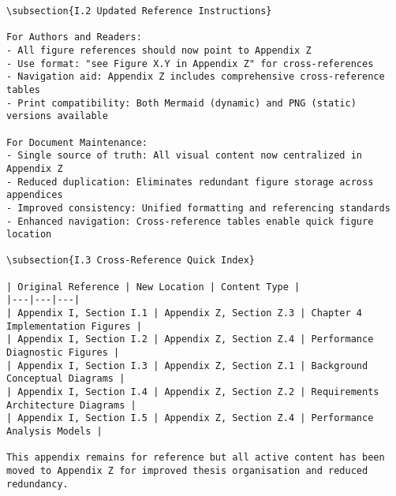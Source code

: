 \begin{verbatim}
\subsection{I.2 Updated Reference Instructions}

For Authors and Readers:
- All figure references should now point to Appendix Z
- Use format: "see Figure X.Y in Appendix Z" for cross-references
- Navigation aid: Appendix Z includes comprehensive cross-reference tables
- Print compatibility: Both Mermaid (dynamic) and PNG (static) versions available

For Document Maintenance:
- Single source of truth: All visual content now centralized in Appendix Z
- Reduced duplication: Eliminates redundant figure storage across appendices
- Improved consistency: Unified formatting and referencing standards
- Enhanced navigation: Cross-reference tables enable quick figure location

\subsection{I.3 Cross-Reference Quick Index}

| Original Reference | New Location | Content Type |
|---|---|---|
| Appendix I, Section I.1 | Appendix Z, Section Z.3 | Chapter 4 Implementation Figures |
| Appendix I, Section I.2 | Appendix Z, Section Z.4 | Performance Diagnostic Figures |
| Appendix I, Section I.3 | Appendix Z, Section Z.1 | Background Conceptual Diagrams |
| Appendix I, Section I.4 | Appendix Z, Section Z.2 | Requirements Architecture Diagrams |
| Appendix I, Section I.5 | Appendix Z, Section Z.4 | Performance Analysis Models |

This appendix remains for reference but all active content has been moved to Appendix Z for improved thesis organisation and reduced redundancy.
\end{verbatim}
